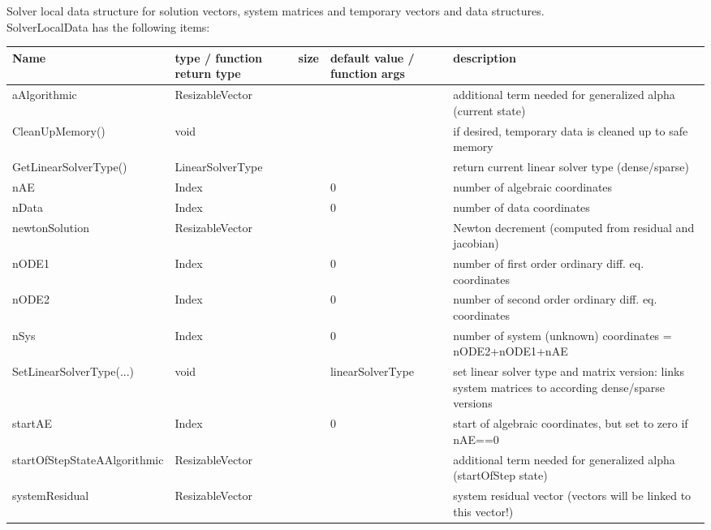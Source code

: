  \label{sec:SolverLocalData}
Solver local data structure for solution vectors, system matrices and temporary vectors and data structures.\\ 
%
SolverLocalData has the following items:
\begin{center}
  \footnotesize
  \begin{longtable}{| p{4.2cm} | p{2.5cm} | p{0.3cm} | p{3.0cm} | p{6cm} |}
    \hline
    \bf Name & \bf type / function return type & \bf size & \bf default value / function args & \bf description \\ \hline
    aAlgorithmic &     ResizableVector &      &      &     additional term needed for generalized alpha (current state)\\ \hline
    CleanUpMemory() &     void &      &      &     if desired, temporary data is cleaned up to safe memory\\ \hline
    GetLinearSolverType() &     LinearSolverType &      &      &     return current linear solver type (dense/sparse)\\ \hline
    nAE &     Index &      &     0 &     number of algebraic coordinates\\ \hline
    nData &     Index &      &     0 &     number of data coordinates\\ \hline
    newtonSolution &     ResizableVector &      &      &     Newton decrement (computed from residual and jacobian)\\ \hline
    nODE1 &     Index &      &     0 &     number of first order ordinary diff. eq. coordinates\\ \hline
    nODE2 &     Index &      &     0 &     number of second order ordinary diff. eq. coordinates\\ \hline
    nSys &     Index &      &     0 &     number of system (unknown) coordinates = nODE2+nODE1+nAE\\ \hline
    SetLinearSolverType(...) &     void &      &     linearSolverType &     set linear solver type and matrix version: links system matrices to according dense/sparse versions\\ \hline
    startAE &     Index &      &     0 &     start of algebraic coordinates, but set to zero if nAE==0\\ \hline
    startOfStepStateAAlgorithmic &     ResizableVector &      &      &     additional term needed for generalized alpha (startOfStep state)\\ \hline
    systemResidual &     ResizableVector &      &      &     system residual vector (vectors will be linked to this vector!)\\ \hline

\end{longtable}
\end{center}
